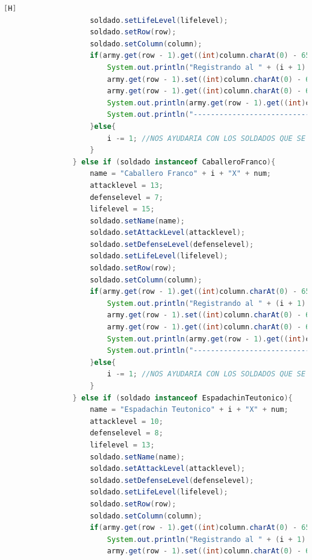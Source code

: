 \documentclass{article}
\begin{document}
\begin{lstlisting}[language=java,caption={Las lineas de codigos de la clase Mapa}][H]
					soldado.setLifeLevel(lifelevel);
					soldado.setRow(row);
					soldado.setColumn(column);
					if(army.get(row - 1).get((int)column.charAt(0) - 65) == null){
						System.out.println("Registrando al " + (i + 1) + " soldado del Ejercito " + armyespe + "");
						army.get(row - 1).set((int)column.charAt(0) - 65, new EspadachinReal(name, attacklevel, defenselevel, lifelevel, speed, "Espadachin Real", true, row, column, attacklevel, attacklevel));
						army.get(row - 1).get((int)column.charAt(0) - 65).setSpeed(speed);
						System.out.println(army.get(row - 1).get((int)column.charAt(0) - 65).toString());
						System.out.println("---------------------------------");
					}else{
						i -= 1; //NOS AYUDARIA CON LOS SOLDADOS QUE SE REPITEN EN EL MISMO CASILLERO CON TAL QUE NO DEBERIA CONTAR 
					}
				} else if (soldado instanceof CaballeroFranco){
					name = "Caballero Franco" + i + "X" + num;
					attacklevel = 13;
					defenselevel = 7;
					lifelevel = 15;
					soldado.setName(name);                  
					soldado.setAttackLevel(attacklevel);
					soldado.setDefenseLevel(defenselevel);                    
					soldado.setLifeLevel(lifelevel);
					soldado.setRow(row);
					soldado.setColumn(column);
					if(army.get(row - 1).get((int)column.charAt(0) - 65) == null){
						System.out.println("Registrando al " + (i + 1) + " soldado del Ejercito " + armyespe + "");
						army.get(row - 1).set((int)column.charAt(0) - 65, new CaballeroFranco(name, attacklevel, defenselevel, lifelevel, speed, "Caballero Franco", true, row, column, attacklevel, attacklevel));
						army.get(row - 1).get((int)column.charAt(0) - 65).setSpeed(speed);
						System.out.println(army.get(row - 1).get((int)column.charAt(0) - 65).toString());
						System.out.println("---------------------------------");
					}else{
						i -= 1; //NOS AYUDARIA CON LOS SOLDADOS QUE SE REPITEN EN EL MISMO CASILLERO CON TAL QUE NO DEBERIA CONTAR 
					}
				} else if (soldado instanceof EspadachinTeutonico){
					name = "Espadachin Teutonico" + i + "X" + num;
					attacklevel = 10;
					defenselevel = 8;
					lifelevel = 13;
					soldado.setName(name);                  
					soldado.setAttackLevel(attacklevel);
					soldado.setDefenseLevel(defenselevel);                    
					soldado.setLifeLevel(lifelevel);
					soldado.setRow(row);
					soldado.setColumn(column);
					if(army.get(row - 1).get((int)column.charAt(0) - 65) == null){
						System.out.println("Registrando al " + (i + 1) + " soldado del Ejercito " + armyespe + "");
						army.get(row - 1).set((int)column.charAt(0) - 65, new EspadachinTeutonico(name, attacklevel, defenselevel, lifelevel, speed, "Espadachin Teutonico", true, row, column, attacklevel, attacklevel));

\end{lstlisting}
\end{document}
